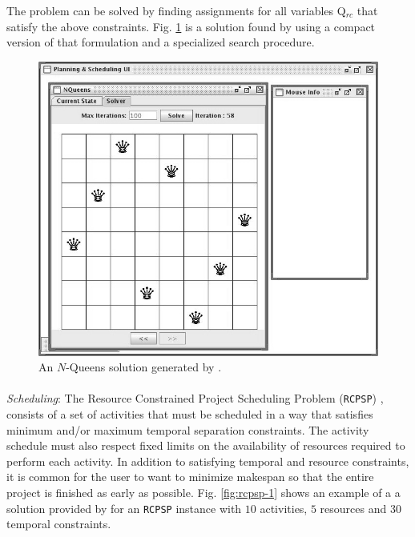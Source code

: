 {The problem can be solved by finding assignments for all variables
Q$_{rc}$ that satisfy the above constraints. Fig. \ref{fig:nqueens-2}
is a solution found by \eu using a compact version of that formulation
and a specialized search procedure.

\begin{figure}
\centering
\includegraphics[scale=0.3]{figs/Example-NQueens1.jpg}
\caption{\small An $N$-Queens solution generated by \eue.}
\label{fig:nqueens-2}
\end{figure}


\paragraph{} \textit{Scheduling}: The Resource Constrained Project
Scheduling Problem (\texttt{RCPSP}) \cite{Bruckera99}, consists of a
set of activities that must be scheduled in a way that satisfies
minimum and/or maximum temporal separation constraints. The activity
schedule must also respect fixed limits on the availability of
resources required to perform each activity. In addition to satisfying
temporal and resource constraints, it is common for the user to want
to minimize makespan \cite{ghallab04} so that the entire project is
finished as early as possible. Fig. \ref{fig:rcpsp-1} shows an example
of a a solution provided by \eu for an \texttt{RCPSP} instance with
$10$ activities, $5$ resources and $30$ temporal constraints.

}
